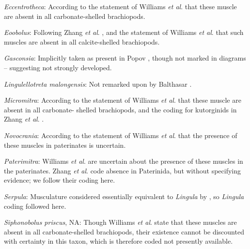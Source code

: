 \documentclass[openany]{book}
\theoremstyle{definition}
\theoremstyle{definition}
\theoremstyle{definition}
\theoremstyle{remark}
\begin{document}
\hypertarget{Eccentrotheca-coding-78}{}
\emph{Eccentrotheca}: According to the statement of Williams \emph{et
al}. \citeyearpar[p.~32]{Williams2000LinguliformeaCraniiformea} that
these muscle are absent in all carbonate-shelled brachiopods.

\hypertarget{Eoobolus-coding-78}{}
\emph{Eoobolus}: Following Zhang \emph{et al}.
\citeyearpar{Zhang2014Anearly}, and the statement of Williams \emph{et
al}. \citeyearpar{Williams2000LinguliformeaCraniiformea} that such
muscles are absent in all calcite-shelled brachiopods.

\hypertarget{Gasconsia-coding-78}{}
\emph{Gasconsia}: Implicitly taken as present in Popov
\citeyearpar{Popov1992TheCambrian}, though not marked in diagrams --
suggesting not strongly developed.

\hypertarget{Lingulellotreta_malongensis-coding-78}{}
\emph{Lingulellotreta malongensis}: Not remarked upon by Balthasar
\citeyearpar{Balthasar2009Thebrachiopod}.

\hypertarget{Micromitra-coding-78}{}
\emph{Micromitra}: According to the statement of Williams \emph{et al}.
\citeyearpar[p.~32]{Williams2000LinguliformeaCraniiformea} that these
muscle are absent in all carbonate- shelled brachiopods, and the coding
for kutorginids in Zhang \emph{et al}. \citeyearpar{Zhang2014Anearly}.

\hypertarget{Novocrania-coding-78}{}
\emph{Novocrania}: According to the statement of Williams \emph{et al}.
\citeyearpar[p.~32]{Williams2000LinguliformeaCraniiformea} that the
presence of these muscles in paterinates is uncertain.

\hypertarget{Paterimitra-coding-78}{}
\emph{Paterimitra}: Williams \emph{et al}.
\citeyearpar[p.~32]{Williams2000LinguliformeaCraniiformea} are uncertain
about the presence of these muscles in the paterinates. Zhang \emph{et
al}. \citeyearpar{Zhang2014Anearly} code absence in Paterinida, but
without specifying evidence; we follow their coding here.

\hypertarget{Serpula-coding-78}{}
\emph{Serpula}: Musculature considered essentially equivalent to
\emph{Lingula} by \citet{Williams2000LinguliformeaCraniiformea}, so
\emph{Lingula} coding followed here.

\hypertarget{Siphonobolus_priscus-coding-78}{}
\emph{Siphonobolus priscus}, NA: Though Williams \emph{et al}.
\citeyearpar[p.~32]{Williams2000LinguliformeaCraniiformea} state that
these muscles are absent in all carbonate-shelled brachiopods, their
existence cannot be discounted with certainty in this taxon, which is
therefore coded not presently available.
\end{document}
